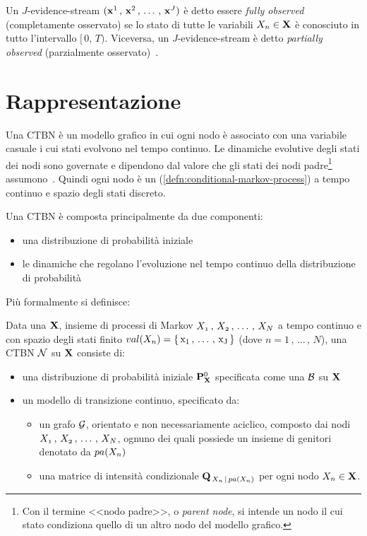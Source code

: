 Un $J$-evidence-stream $(\mathbf{x}^1\,,\,\mathbf{x}^2\,,\,\dotsc\,,\,\mathbf{x}^J)$ è detto essere \emph{fully observed} (completamente osservato) se lo stato di tutte le variabili $\mathnormal{X_n}\in\mathbf{X}$ è conosciuto in tutto l'intervallo $[\,0,\,T)$. Viceversa, un $J$-evidence-stream è detto \emph{partially observed} (parzialmente osservato)~\cite{Stella2012}.

\section{Rappresentazione}
\label{sec:ctbn-rappresentazione}
Una \acl{CTBN} è un modello grafico in cui ogni nodo è associato con una variabile casuale i cui stati evolvono nel tempo continuo. Le dinamiche evolutive degli stati dei nodi sono governate e dipendono dal valore che gli stati dei nodi padre\footnote{Con il termine <<nodo padre>>, o \emph{parent node}, si intende un nodo il cui stato condiziona quello di un altro nodo del modello grafico.} assumono~\cite{Stella2012}. Quindi ogni nodo è un \conm\mprocess{} (\ref{defn:conditional-markov-process}) a tempo continuo e spazio degli stati discreto.

Una \acs{CTBN} è composta principalmente da due componenti:
\begin{itemize}
    \item una distribuzione di probabilità iniziale
    \item le dinamiche che regolano l'evoluzione nel tempo continuo della distribuzione di probabilità
\end{itemize}
Più formalmente si definisce:
\begin{definizione}
\label{defn:ctbn}
Data una  $\mathbf{X}$, insieme di processi di Markov $\mathnormal{X_1}\,,\,\mathnormal{X_2}\,,\,\dotsc\,,\,\mathnormal{X_N}$ a tempo continuo e con spazio degli stati finito $val(\mathnormal{X_n})=\{\,\mathrm{x_1}\,,\,\dotsc\,,\,\mathrm{x_J}\,\}$ (dove $n=1\,,\,\dotsc\,,\,N$), una \acs{CTBN} $\mathcal{N}$ su $\mathbf{X}$ consiste di:
\begin{itemize}
    \item una distribuzione di probabilità iniziale $\mathbf{P}^0_{\mathbf{X}}$ specificata come una \bn{} $\mathcal{B}$ su $\mathbf{X}$
    \item un modello di transizione continuo, specificato da:
    \begin{itemize}
        \item un grafo $\mathcal{G}$, orientato e non necessariamente aciclico, composto dai nodi $\mathnormal{X_1}\,,\,\mathnormal{X_2}\,,\,\dotsc\,,\,\mathnormal{X_N}$, ognuno dei quali possiede un insieme di genitori denotato da $pa(\mathnormal{X_n})$
        \item una matrice di intensità condizionale $\mathbf{Q}_{\,\mathnormal{X_n}\,\arrowvert\,pa(\mathnormal{X_n})}$ per ogni nodo $\mathnormal{X_n} \in \mathbf{X}$.
    \end{itemize}
\end{itemize}
\end{definizione}

